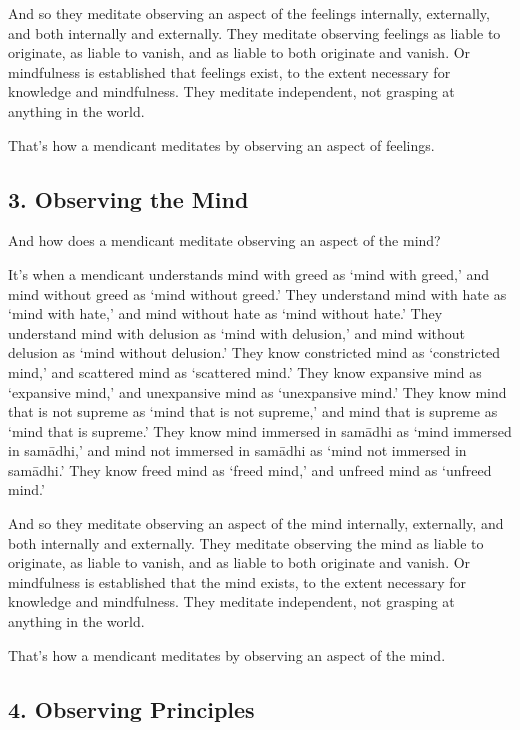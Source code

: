\documentclass[12pt,openany]{book}%
\begin{document}
And so they meditate observing an aspect of the feelings internally, externally, and both internally and externally. They meditate observing feelings as liable to originate, as liable to vanish, and as liable to both originate and vanish. Or mindfulness is established that feelings exist, to the extent necessary for knowledge and mindfulness. They meditate independent, not grasping at anything in the world. 

That’s how a mendicant meditates by observing an aspect of feelings. 

\subsection*{3. Observing the Mind }

And how does a mendicant meditate observing an aspect of the mind? 

It’s when a mendicant understands mind with greed as ‘mind with greed,’ and mind without greed as ‘mind without greed.’ They understand mind with hate as ‘mind with hate,’ and mind without hate as ‘mind without hate.’ They understand mind with delusion as ‘mind with delusion,’ and mind without delusion as ‘mind without delusion.’ They know constricted mind as ‘constricted mind,’ and scattered mind as ‘scattered mind.’ They know expansive mind as ‘expansive mind,’ and unexpansive mind as ‘unexpansive mind.’ They know mind that is not supreme as ‘mind that is not supreme,’ and mind that is supreme as ‘mind that is supreme.’ They know mind immersed in \textsanskrit{samādhi} as ‘mind immersed in \textsanskrit{samādhi},’ and mind not immersed in \textsanskrit{samādhi} as ‘mind not immersed in \textsanskrit{samādhi}.’ They know freed mind as ‘freed mind,’ and unfreed mind as ‘unfreed mind.’ 

And so they meditate observing an aspect of the mind internally, externally, and both internally and externally. They meditate observing the mind as liable to originate, as liable to vanish, and as liable to both originate and vanish. Or mindfulness is established that the mind exists, to the extent necessary for knowledge and mindfulness. They meditate independent, not grasping at anything in the world. 

That’s how a mendicant meditates by observing an aspect of the mind. 

\subsection*{4. Observing Principles }
\end{document}
